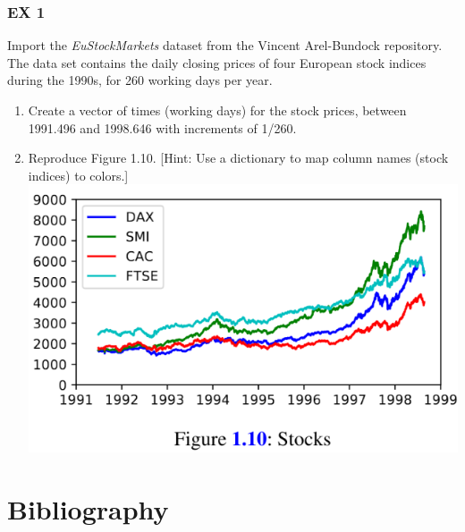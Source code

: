 \documentclass{beamer}
\begin{document}
\begin{frame}[allowframebreaks]
  \frametitle{EX 1}
  \begin{Exercise}[title={Data visualization}]
    Import the {\em EuStockMarkets} dataset from the Vincent Arel-Bundock repository. The data set contains the daily closing prices of four European stock indices during the
    1990s, for 260 working days per year.
    \begin{enumerate}
      \item Create a vector of times (working days) for the stock prices, between 1991.496 and 1998.646 with increments of 1/260.
      \item Reproduce Figure 1.10. [Hint: Use a dictionary to map column names (stock indices) to colors.]
      \includegraphics[width=0.9\linewidth]{stocks}
    \end{enumerate}
  \end{Exercise}
\end{frame}


\section{Bibliography}


\end{document}
